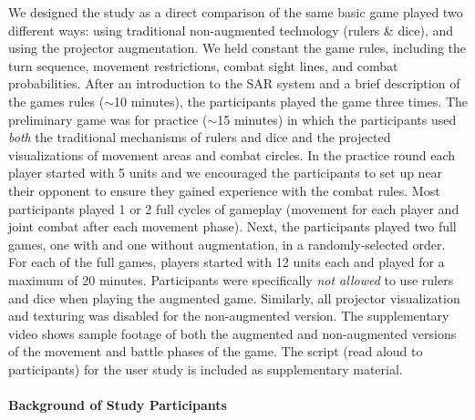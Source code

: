 \documentclass[10pt,twocolumn,letterpaper]{article}
\begin{document}
We designed the study as a direct comparison of the same basic game
played two different ways: using traditional non-augmented technology
(rulers \& dice), and using the projector augmentation.  We held
constant the game rules, including the turn sequence, movement
restrictions, combat sight lines, and combat probabilities.
%
After an introduction to the SAR system and a brief description of the
games rules ($\sim$10 minutes), the participants played the game three
times.  The preliminary game was for practice ($\sim$15 minutes)
in which the participants used {\em both} the traditional mechanisms
of rulers and dice and the projected visualizations of movement areas
and combat circles.  In the practice round each player started with 5
units and we encouraged the participants to set up near their
opponent to ensure they gained experience with the combat rules.  Most
participants played 1 or 2 full cycles of gameplay (movement for each
player and joint combat after each movement phase).
%
Next, the participants played two full games, one with and one without
augmentation, in a randomly-selected order.  For each of the full
games, players started with 12 units each and played for a maximum of
20 minutes.  Participants were specifically {\em not allowed} to use
rulers and dice when playing the augmented game.  Similarly, all
projector visualization and texturing was disabled for the
non-augmented version.
%
The supplementary video shows sample footage of both the augmented and
non-augmented versions of the movement and battle phases of the game.
The script (read aloud to participants) for the user study is included
as supplementary material.

\vspace{-0.15in}
\paragraph{Background of Study Participants}
\end{document}
